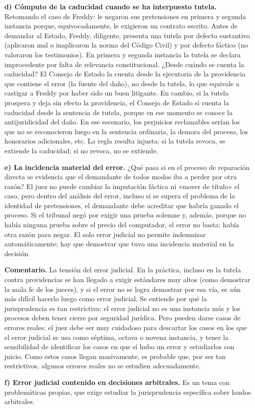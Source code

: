 \textbf{d) Cómputo de la caducidad cuando se ha interpuesto tutela.} Retomando el caso de Freddy: le negaron sus pretensiones en primera y segunda instancia porque, equivocadamente, le exigieron un contrato escrito. Antes de demandar al Estado, Freddy, diligente, presenta una tutela por defecto sustantivo (aplicaron mal o inaplicaron la norma del Código Civil) y por defecto fáctico (no valoraron los testimonios). En primera y segunda instancia la tutela se declara improcedente por falta de relevancia constitucional. ¿Desde cuándo se cuenta la caducidad? El Consejo de Estado la cuenta desde la ejecutoria de la providencia que contiene el error (la fuente del daño), no desde la tutela, lo que equivale a castigar a Freddy por haber sido un buen litigante. En cambio, si la tutela prospera y deja sin efecto la providencia, el Consejo de Estado sí cuenta la caducidad desde la sentencia de tutela, porque en ese momento se conoce la antijuridicidad del daño. En ese escenario, los perjuicios reclamables serían los que no se reconocieron luego en la sentencia ordinaria, la demora del proceso, los honorarios adicionales, etc. La regla resulta injusta: si la tutela revoca, se extiende la caducidad; si no revoca, no se extiende.

\textbf{e) La incidencia material del error.} ¿Qué pasa si en el proceso de reparación directa se evidencia que el demandante de todos modos iba a perder por otra razón? El juez no puede cambiar la imputación fáctica ni «mover de título» el caso, pero dentro del análisis del error, incluso si se supera el problema de la identidad de pretensiones, el demandante debe acreditar que habría ganado el proceso. Si el tribunal negó por exigir una prueba solemne y, además, porque no había ninguna prueba sobre el precio del computador, el error no basta: había otra razón para negar. El solo error judicial no permite indemnizar automáticamente; hay que demostrar que tuvo una incidencia material en la decisión.

\begin{comentario}
\textcolor[HTML]{8A6D3B}{\textbf{Comentario. }}La tensión del error judicial. En la práctica, incluso en la tutela contra providencias se han llegado a exigir estándares muy altos (como demostrar la mala fe de los jueces), y si el error no se logra demostrar por esa vía, es aún más difícil hacerlo luego como error judicial. Se entiende por qué la jurisprudencia es tan restrictiva: el error judicial no es una instancia más y los procesos deben tener cierre por seguridad jurídica. Pero pueden darse casos de errores reales: el juez debe ser muy cuidadoso para descartar los casos en los que el error judicial se usa como séptima, octava o novena instancia, y tener la sensibilidad de identificar los casos en que sí hubo un error y estudiarlos con juicio. Como estos casos llegan masivamente, es probable que, por ser tan restrictivos, algunos errores reales no se estudien adecuadamente.
\end{comentario}
\textbf{f) Error judicial contenido en decisiones arbitrales.} Es un tema con problemáticas propias, que exige estudiar la jurisprudencia específica sobre laudos arbitrales.

